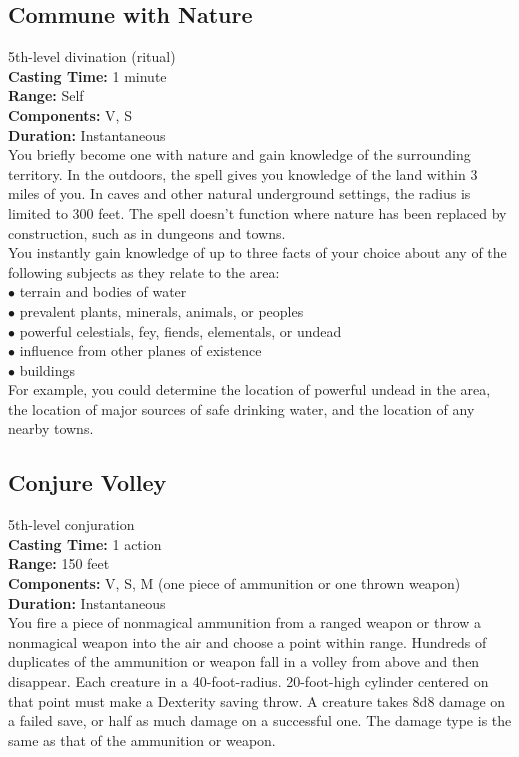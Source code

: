 \documentclass[11pt, A4paper, english]{article}
\begin{document}
		\subsection{Commune with Nature}
5th-level divination (ritual) \\
\textbf{Casting Time:} 1 minute \\
\textbf{Range:} Self \\
\textbf{Components:} V, S \\
\textbf{Duration:} Instantaneous \\
You briefly become one with nature and gain knowledge of the surrounding territory. In the outdoors, the spell gives you knowledge of the land within 3 miles of you. In caves and other natural underground settings, the radius is limited to 300 feet. The spell doesn’t function where nature has been replaced by construction, such as in dungeons and towns. \\
You instantly gain knowledge of up to three facts of your choice about any of the following subjects as they relate to the area: \\
\indent $\bullet$ terrain and bodies of water \\
\indent $\bullet$ prevalent plants, minerals, animals, or peoples \\
\indent $\bullet$ powerful celestials, fey, fiends, elementals, or undead \\
\indent $\bullet$ influence from other planes of existence \\
\indent $\bullet$ buildings \\
For example, you could determine the location of powerful undead in the area, the location of major sources of safe drinking water, and the location of any nearby towns.

		\subsection{Conjure Volley}
5th-level conjuration \\
\textbf{Casting Time:} 1 action \\
\textbf{Range:} 150 feet \\
\textbf{Components:} V, S, M (one piece of ammunition or one thrown weapon) \\
\textbf{Duration:} Instantaneous \\
You fire a piece of nonmagical ammunition from a ranged weapon or throw a nonmagical weapon into the air and choose a point within range. Hundreds of duplicates of the ammunition or weapon fall in a volley from above and then disappear. Each creature in a 40-foot-radius. 20-foot-high cylinder centered on that point must make a Dexterity saving throw. A creature takes 8d8 damage on a failed save, or half as much damage on a successful one. The damage type is the same as that of the ammunition or weapon.
\end{document}
